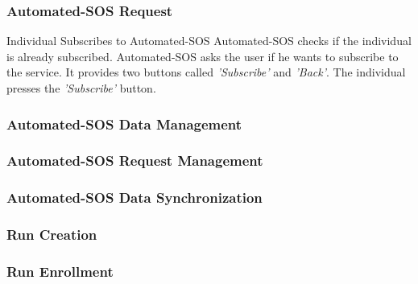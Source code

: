 \documentclass[a4paper]{article}
\begin{document}
        
        \subsubsection{Automated-SOS Request}
        
        \begin{usecase}{Individual Subscribes to Automated-SOS}
              {Automated-SOS checks if the individual is already subscribed.}
              {Automated-SOS asks the user if he wants to subscribe to the service. It provides two buttons called \textit{'Subscribe'} and \textit{'Back'}.}
              {The individual presses the \textit{'Subscribe'} button.}
        \end{usecase}
        
        \subsubsection{Automated-SOS Data Management}
        
        \subsubsection{Automated-SOS Request Management}
        
        \subsubsection{Automated-SOS Data Synchronization}
        
        \subsubsection{Run Creation}
        
        \subsubsection{Run Enrollment}
        
\end{document}
